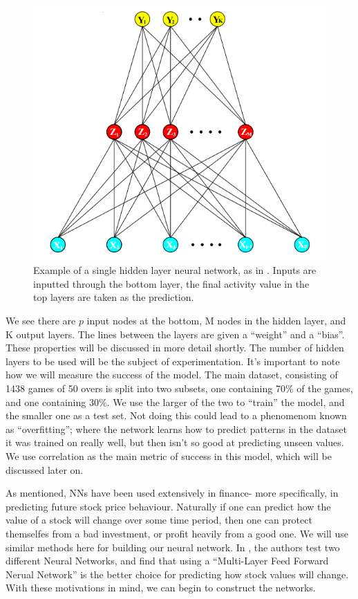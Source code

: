 \begin{figure}
    \centering
    \includegraphics[scale=0.5]{figures/nn.png}
    \caption{Example of a single hidden layer neural network, as in \cite{sprbk}. Inputs are inputted through the bottom layer, the final activity value in the top
    layers are taken as the prediction.}
    \label{nnexample1}
\end{figure}

We see there are $p$ input nodes at the bottom, M nodes in the hidden layer, and K output layers. The lines between the layers are given a ``weight''
and a ``bias''. These properties will be discussed in more detail shortly. The number of hidden layers to be used will be the subject of experimentation. 
It's important to note how we will measure the success of the model. The main dataset, consisting of 1438 games of 50 overs is split into two subsets, one 
containing 70\% of the games, and one containing 30\%. We use the larger of the two to ``train'' the model, and the smaller one as a test set. Not doing this could 
lead to a phenomenom known as ``overfitting''; where the network learns how to predict patterns in the dataset it was trained on really well, but then isn't so good 
at predicting unseen values. We use correlation as the main metric of success in this model, which will be discussed later on.

As mentioned, NNs have been used extensively in finance- more specifically, in predicting future stock price behaviour. Naturally if one can predict how the value of a stock
will change over some time period, then one can protect themselfes from a bad investment, or profit heavily from a good one. We will use similar
methods here for building our neural network.  In \cite{nnstock}, the authors test two different Neural Networks, and find that using a ``Multi-Layer Feed Forward Nerual Network''
is the better choice for predicting how stock values will change. With these motivations in mind, we can begin to construct the networks.

